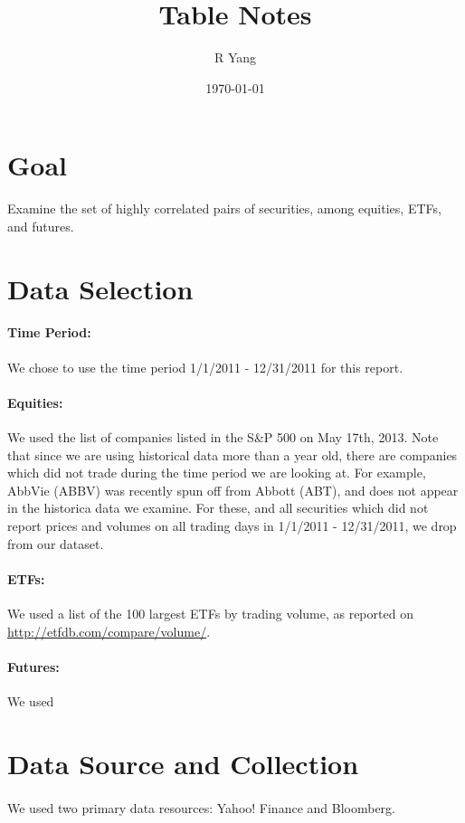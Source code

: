 \documentclass[11pt]{article}
\title{\textbf{Table Notes}}
\author{R Yang}
\date{\today}
\begin{document}
\maketitle

\section{Goal}
Examine the set of highly correlated pairs of securities, among equities, ETFs, and futures.

\section{Data Selection}

\paragraph{Time Period:} We chose to use the time period 1/1/2011 - 12/31/2011 for this report.

\paragraph{Equities:} We used the list of companies listed in the S\&P 500 on May 17th, 2013. Note that since we are using historical data more than a year old, there are companies which did not trade during the time period we are looking at. For example, AbbVie (ABBV) was recently spun off from Abbott (ABT), and does not appear in the historica data we examine. For these, and all securities which did not report prices and volumes on all trading days in 1/1/2011 - 12/31/2011, we drop from our dataset.

\paragraph{ETFs:} We used a list of the 100 largest ETFs by trading volume, as reported on \url{http://etfdb.com/compare/volume/}.

\paragraph{Futures:} We used 


\section{Data Source and Collection}
\paragraph{}
We used two primary data resources: Yahoo! Finance and Bloomberg. 
\end{document}
